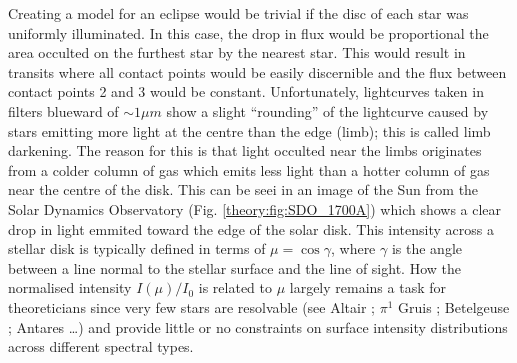 Creating a model for an eclipse would be trivial if the disc of each star was uniformly illuminated. In this case, the drop in flux would be proportional the area occulted on the furthest star by the nearest star. This would result in transits where all contact points would be easily discernible and the flux between contact points 2 and 3 would be constant. Unfortunately,  lightcurves taken in filters blueward of $\sim 1 \mu m$ show a slight ``rounding'' of the lightcurve caused by stars emitting more light at the centre than the edge (limb); this is called limb darkening. The reason for this is that light occulted near the limbs originates from a colder column of gas which emits less light than a hotter column of gas near the centre of the disk. This can be seei in an image of the Sun from the Solar Dynamics Observatory (Fig. \ref{theory:fig:SDO_1700A}) which shows a clear drop in light emmited toward the edge of the solar disk.  This intensity across a stellar disk is typically defined in terms of $\mu = \cos \gamma$, where $\gamma$ is the angle between a line normal to the stellar surface and the line of sight. How the normalised intensity $I(\mu)/I_0$ is related to $\mu$ largely remains a task for theoreticians since very few stars are resolvable (see Altair \citealt{2007Sci...317..342M}; $\pi^1$ Gruis \citealt{2018Natur.553..310P}; Betelgeuse \citealt{1998AJ....116.2501U}; Antares \citealt{2017Natur.548..310O} \ldots) and provide little or no constraints on surface intensity distributions across different spectral types.

